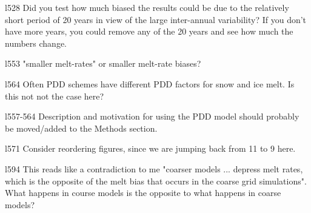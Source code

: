 \documentclass[12pt,oneside,a4paper]{article}%
\begin{document}
l528 Did you test how much biased the results could be due to the relatively short period of 20 years in view of the large inter-annual variability? If you don't have more years, you could remove any of the 20 years and see how much the numbers change. \newline

{\color{blue}{We've done performed a Monte Carlo analysis similar to what is suggested and have found that the errors due to inter-annual variability (in Figure 10) are much smaller than our current error bars, and have therefore omitted these estimates.}} \newline

l553 "smaller melt-rates" or smaller melt-rate biases? \newline

{\color{blue}{since both are true, replaced with ``smaller melt-rates and melt-rate biases."}} \newline

l564 Often PDD schemes have different PDD factors for snow and ice melt. Is this not not the case here? \newline

{\color{blue}{To simplify the calculation I just took an intermediate value between snow and ice (Braithwaite 1984 uses 3 mm/d/C and 7 mm/d/C for ice), so I wouldn't need to approximate how to partition at particular monthly average grid cell. Added these details in the manuscript in parenthesis.}} \newline

l557-564 Description and motivation for using the PDD model should probably be moved/added to the Methods section. \newline

{\color{blue}{Our personal opinion is that defining it on the fly, naturally arising from the analysis to explain a discrepancy between two contrasting results, is preferable instead of premeditating it earlier on in the manuscript.}} \newline

l571 Consider reordering figures, since we are jumping back from 11 to 9 here. \newline

l594 This reads like a contradiction to me "coarser models ... depress melt rates, which is the opposite of the melt bias that occurs in the coarse grid simulations". What happens in course models is the opposite to what happens in coarse models? \newline
\end{document}

